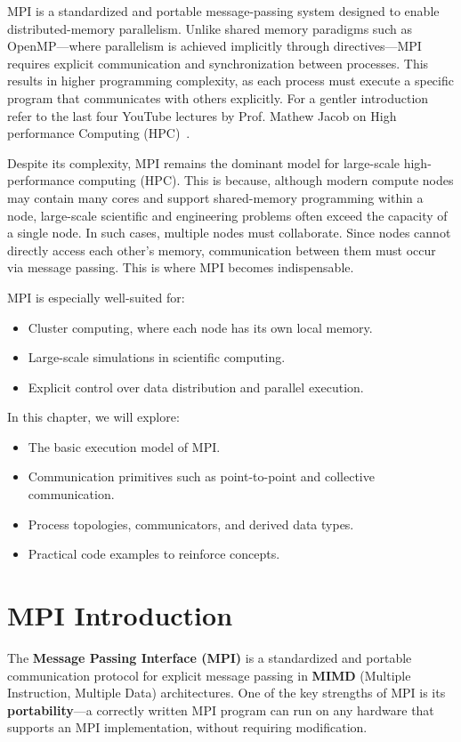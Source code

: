 \documentclass[12pt]{book}
\begin{document}
MPI is a standardized and portable message-passing system designed to enable distributed-memory parallelism. Unlike shared memory paradigms such as OpenMP—where parallelism is achieved implicitly through directives—MPI requires explicit communication and synchronization between processes. This results in higher programming complexity, as each process must execute a specific program that communicates with others explicitly. For a gentler introduction refer to the last four YouTube lectures by Prof. Mathew Jacob on High performance Computing (HPC)~\cite{nptel-hpc-intro}.

Despite its complexity, MPI remains the dominant model for large-scale high-performance computing (HPC). This is because, although modern compute nodes may contain many cores and support shared-memory programming within a node, large-scale scientific and engineering problems often exceed the capacity of a single node. In such cases, multiple nodes must collaborate. Since nodes cannot directly access each other’s memory, communication between them must occur via message passing. This is where MPI becomes indispensable.

MPI is especially well-suited for:
\begin{itemize}
    \item Cluster computing, where each node has its own local memory.
    \item Large-scale simulations in scientific computing.
    \item Explicit control over data distribution and parallel execution.
\end{itemize}

In this chapter, we will explore:
\begin{itemize}
    \item The basic execution model of MPI.
    \item Communication primitives such as point-to-point and collective communication.
    \item Process topologies, communicators, and derived data types.
    \item Practical code examples to reinforce concepts.
\end{itemize}


\section{MPI Introduction}

The \textbf{Message Passing Interface (MPI)} is a standardized and portable communication protocol for explicit message passing in \textbf{MIMD} (Multiple Instruction, Multiple Data) architectures. One of the key strengths of MPI is its \textbf{portability}—a correctly written MPI program can run on any hardware that supports an MPI implementation, without requiring modification.
\end{document}
